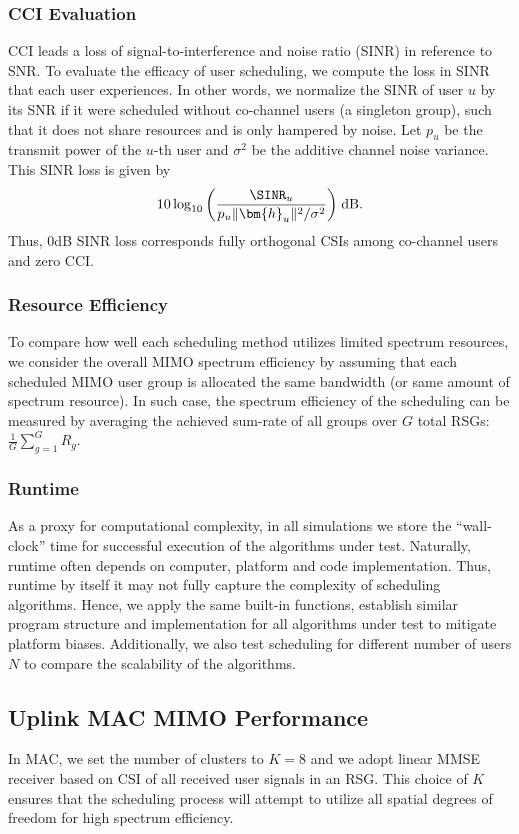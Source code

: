\subsubsection{CCI Evaluation}
CCI leads a loss of signal-to-interference and noise ratio (SINR) in reference to SNR. 
To evaluate the efficacy of user scheduling, we compute the loss in SINR that each user experiences. 
In other words, we normalize the SINR of user $u$ by its SNR if it were scheduled without co-channel users (a singleton group), such that it does not share resources and is only hampered by noise. 
Let $p_u$ be the transmit power of the $u$-th user and $\sigma^2$ be the additive channel noise variance. 
This SINR loss is given by
\begin{align}
10 \log_{10}\bigg(	\frac{\SINR_u}{p_u\|\bm{h}_u\|^2/\sigma^2}\bigg) \; \mbox{dB}.\label{usch:eqn:normalized_sinr}
\end{align}
Thus, 0dB SINR loss corresponds fully orthogonal CSIs among co-channel users and zero CCI. 
 
 
\subsubsection{Resource Efficiency}
To compare how well each scheduling method utilizes limited spectrum resources, we consider the overall MIMO spectrum efficiency by assuming that each scheduled MIMO user group is allocated the same bandwidth (or same
amount of spectrum resource). 
In such case, the spectrum efficiency of the scheduling can be measured by 
averaging the  achieved sum-rate of all groups over $G$ total RSGs: 
$
\frac{1}{G}\sum_{g=1}^G R_{g}.
$


\subsubsection{Runtime}
As a proxy for computational complexity, in all simulations we store the ``wall-clock'' time for successful execution of the algorithms under test. 
Naturally, runtime often depends on computer, platform and code implementation. 
Thus, runtime by itself it may not fully capture the complexity of scheduling algorithms. 
Hence, we apply the same built-in functions, establish similar program structure and implementation for all algorithms under test to mitigate platform biases.
Additionally, we also test scheduling for different number of users $N$ to compare the scalability of the algorithms. 

\subsection{Uplink MAC MIMO Performance}
In MAC, we set the number of clusters to $K=8$ and we adopt linear MMSE receiver based on CSI of all received user signals in an RSG.  
This choice of $K$ ensures that the scheduling process will attempt to utilize all spatial degrees of freedom for high spectrum efficiency. 

